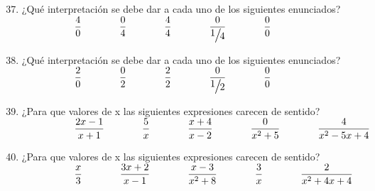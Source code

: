 \documentclass[10pt,a4paper]{article}
\begin{document}
\begin{enumerate}[label=\textbf{\arabic*.}]%
\setcounter{enumi}{36}
\item ¿Qué interpretación se debe dar a cada uno de los siguientes enunciados?\\

${\displaystyle \Large \ \hspace{1.5cm}\ \frac{4}{0} \ \hspace{1cm}\ \frac{0}{4} \ \hspace{1cm}\ \frac{4}{4} \ \hspace{1cm}\ \frac{0}{\sfrac{1}{4}} \ \hspace{1cm}\ \frac{0}{0}}$

\item ¿Qué interpretación se debe dar a cada uno de los siguientes enunciados?\\

${\displaystyle \Large \ \hspace{1.5cm}\ \frac{2}{0} \ \hspace{1cm}\ \frac{0}{2} \ \hspace{1cm}\ \frac{2}{2} \ \hspace{1cm}\ \frac{0}{\sfrac{1}{2}} \ \hspace{1cm}\ \frac{0}{0}}$

\item ¿Para que valores de x las siguientes expresiones carecen de sentido?\\

${\displaystyle \Large \ \hspace{1.5cm}\ \frac{2x-1}{x+1} \ \hspace{1cm}\ \frac{5}{x} \ \hspace{1cm}\ \frac{x+4}{x-2} \ \hspace{1cm}\ \frac{0}{x^{2}+5} \ \hspace{1cm}\ \frac{4}{x^{2}-5x+4}}$

\item ¿Para que valores de x las siguientes expresiones carecen de sentido?\\

${\displaystyle \Large \ \hspace{1.5cm}\ \frac{x}{3} \ \hspace{1cm}\ \frac{3x+2}{x-1} \ \hspace{1cm}\ \frac{x-3}{x^{2}+8} \ \hspace{1cm}\ \frac{3}{x} \ \hspace{1cm}\ \frac{2}{x^{2}+4x+4}}$





 
\end{enumerate}
\end{document}

